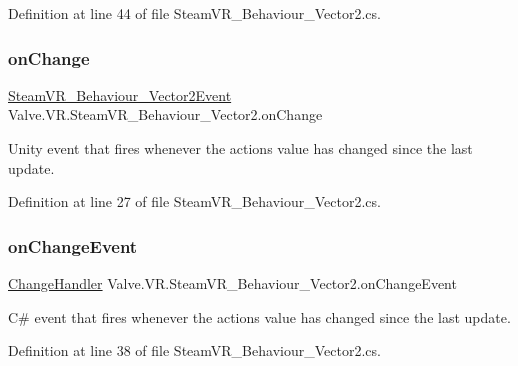 Definition at line 44 of file Steam\+V\+R\+\_\+\+Behaviour\+\_\+\+Vector2.\+cs.

\mbox{\label{class_valve_1_1_v_r_1_1_steam_v_r___behaviour___vector2_a49bf745f1c1c47440619c60913fa9132}} 
\subsubsection{\texorpdfstring{onChange}{onChange}}
{\footnotesize\ttfamily \mbox{\hyperlink{class_valve_1_1_v_r_1_1_steam_v_r___behaviour___vector2_event}{Steam\+V\+R\+\_\+\+Behaviour\+\_\+\+Vector2\+Event}} Valve.\+V\+R.\+Steam\+V\+R\+\_\+\+Behaviour\+\_\+\+Vector2.\+on\+Change}



Unity event that fires whenever the action\textquotesingle{}s value has changed since the last update. 



Definition at line 27 of file Steam\+V\+R\+\_\+\+Behaviour\+\_\+\+Vector2.\+cs.

\mbox{\label{class_valve_1_1_v_r_1_1_steam_v_r___behaviour___vector2_ae08a254e3b773ea02af1bca840ee25ed}} 
\subsubsection{\texorpdfstring{onChangeEvent}{onChangeEvent}}
{\footnotesize\ttfamily \mbox{\hyperlink{class_valve_1_1_v_r_1_1_steam_v_r___behaviour___vector2_aae8467eb06531543c1ea5b6033b53495}{Change\+Handler}} Valve.\+V\+R.\+Steam\+V\+R\+\_\+\+Behaviour\+\_\+\+Vector2.\+on\+Change\+Event}



C\# event that fires whenever the action\textquotesingle{}s value has changed since the last update. 



Definition at line 38 of file Steam\+V\+R\+\_\+\+Behaviour\+\_\+\+Vector2.\+cs.

